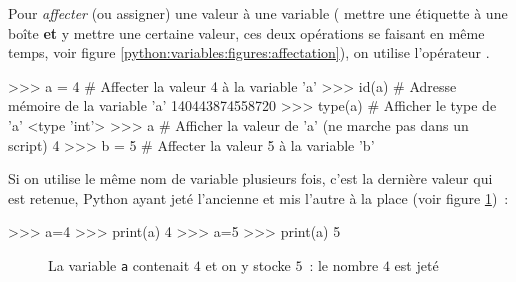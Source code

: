 Pour \textit{affecter} (ou assigner) une valeur à une variable (\cad{} mettre une étiquette à une
boîte \textbf{et} y mettre une certaine valeur, ces deux opérations se faisant en même temps, voir
figure \ref{python:variables:figures:affectation}),
 on utilise l'opérateur \motcle{=}.
\begin{pythoncode}
>>> a = 4           # Affecter la valeur 4 à la variable 'a'
>>> id(a)           # Adresse mémoire de la variable 'a'
140443874558720
>>> type(a)         # Afficher le type de 'a'
<type 'int'>
>>> a               # Afficher la valeur de 'a' (ne marche pas dans un script)
4
>>> b = 5           # Affecter la valeur 5 à la variable 'b'
\end{pythoncode}
Si on utilise le même nom de variable plusieurs fois, c'est la dernière valeur qui est retenue,
Python ayant jeté l'ancienne et mis l'autre à la place (voir figure \ref{python:variables:figures:utilisation2})~:
\begin{pythoncode}
>>> a=4
>>> print(a)
4
>>> a=5
>>> print(a)
5
\end{pythoncode}
\begin{figure}[h]
\centering
\caption{La variable \texttt{a} contenait $4$ et on y stocke $5$~: le nombre $4$ est jeté}
\label{python:variables:figures:utilisation2}
\end{figure}
